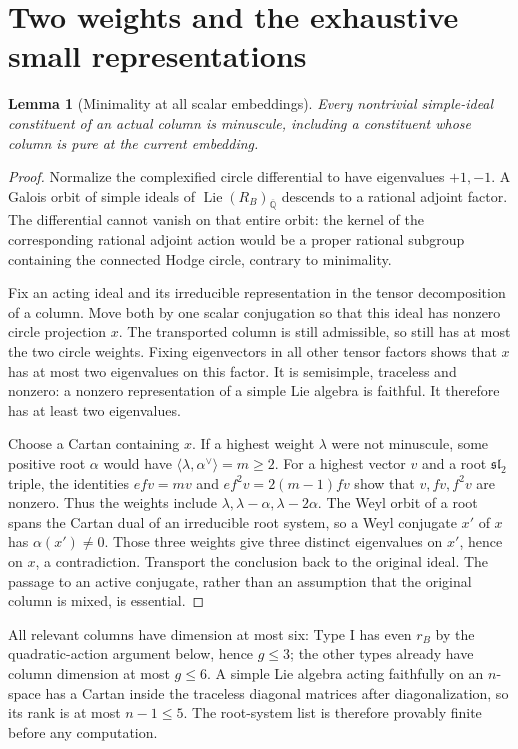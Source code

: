 \documentclass[11pt]{article}
\newcommand{\kk}{{\overline{\mathbb Q}}}
\DeclareMathOperator{\Lie}{Lie}
\newtheorem{lemma}[theorem]{Lemma}
\theoremstyle{remark}
\begin{document}
\section{Two weights and the exhaustive small representations}

\begin{lemma}[Minimality at all scalar embeddings]\label{lem:minuscule}
Every nontrivial simple-ideal constituent of an actual column is
minuscule, including a constituent whose column is pure at the current
embedding.
\end{lemma}
\begin{proof}
Normalize the complexified circle differential to have eigenvalues
$+1,-1$. A Galois orbit of simple ideals of $\Lie(R_B)_\kk$ descends
to a rational adjoint factor. The differential cannot vanish on that
entire orbit: the kernel of the corresponding rational adjoint action
would be a proper rational subgroup containing the connected Hodge
circle, contrary to minimality.

Fix an acting ideal and its irreducible representation in the tensor
decomposition of a column. Move both by one scalar conjugation so
that this ideal has nonzero circle projection $x$. The transported
column is still admissible, so still has at most the two circle
weights. Fixing eigenvectors in all other tensor factors shows that
$x$ has at most two eigenvalues on this factor. It is semisimple,
traceless and nonzero: a nonzero representation of a simple Lie
algebra is faithful. It therefore has at least two eigenvalues.

Choose a Cartan containing $x$. If a highest weight $\lambda$ were
not minuscule, some positive root $\alpha$ would have
$\langle\lambda,\alpha^\vee\rangle=m\geq2$. For a highest vector
$v$ and a root $\mathfrak{sl}_2$ triple, the identities
$efv=mv$ and $ef^2v=2(m-1)fv$ show that $v,fv,f^2v$ are nonzero.
Thus the weights include
$\lambda,\lambda-\alpha,\lambda-2\alpha$. The Weyl orbit of a root
spans the Cartan dual of an irreducible root system, so a Weyl
conjugate $x'$ of $x$ has $\alpha(x')\ne0$. Those three weights give
three distinct eigenvalues on $x'$, hence on $x$, a contradiction.
Transport the conclusion back to the original ideal. The passage to
an active conjugate, rather than an assumption that the original
column is mixed, is essential.
\end{proof}

All relevant columns have dimension at most six: Type I has even
$r_B$ by the quadratic-action argument below, hence $g\leq3$;
the other types already have column dimension at most $g\leq6$.
A simple Lie algebra acting faithfully on an $n$-space has a Cartan
inside the traceless diagonal matrices after diagonalization, so its
rank is at most $n-1\leq5$. The root-system list is therefore
provably finite before any computation.
\end{document}
